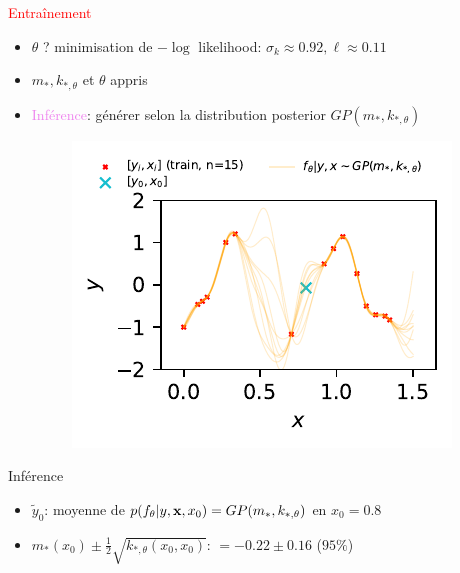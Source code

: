 \documentclass[xcolor=svgnames, t]{beamer}
\newcommand{\vectorx}[1]{\boldsymbol{\MakeLowercase{\mathbf{#1}}}}
\newcommand{\tored}[1]{\textcolor{red}{#1}}
\newcommand{\toblue}[1]{\textcolor{internationalblue}{#1}}
\newcommand{\topurple}[1]{\textcolor{violet}{#1}}
\begin{document}
\begin{frame}{\subsecname}
  \tored{Entraînement}
  \begin{itemize}
    \item<1-> $\theta$ ? minimisation de $-\log$ likelihood: $\sigma_k \approx 0.92, \ell \approx 0.11$
    \item<2-> $m_{*}, k_{*, \theta}$ et $\theta$ appris
    \item<3-> \topurple{Inférence}: générer selon la distribution posterior $GP( m_{*}, k_{*, \theta} )$
      \begin{figure}
        \includegraphics{gp_1D_example_noisefree_pred.pdf}
      \end{figure}
  \end{itemize}
\end{frame}

\begin{frame}{\subsecname}
  \toblue{Inférence}
  \begin{itemize}
    \item $\tilde{y}_0$: moyenne de $p(f_\theta | y, \vectorx{x}, x_0) = GP(m_{*}, k_{*, \theta})$ en $x_0 =0.8$
    \item $m_{*}(x_0) \pm \frac{1}{2} \sqrt{k_{*, \theta}(x_0, x_0)}$: $ = -0.22 \pm 0.16$ ($95\%$)
  \end{itemize}
\end{frame}
\end{document}
